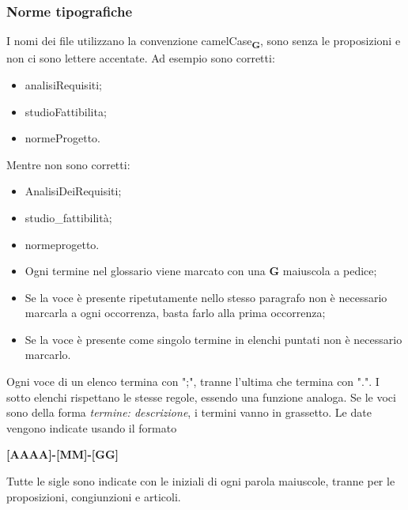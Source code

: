         \subsubsection{Norme tipografiche}
            I nomi dei file utilizzano la convenzione camelCase\textsubscript{\textbf{G}}, sono senza le proposizioni e non ci sono lettere accentate.
            Ad esempio sono corretti:
            \begin{itemize}
                \item analisiRequisiti;
                \item studioFattibilita;
                \item normeProgetto.
            \end{itemize}
            Mentre non sono corretti:
            \begin{itemize}
                \item AnalisiDeiRequisiti;
                \item studio\_fattibilità;
                \item normeprogetto.
            \end{itemize}
            
            \begin{itemize}
                \item Ogni termine nel glossario viene marcato con una \textbf{G} maiuscola a pedice;
                \item Se la voce è presente ripetutamente nello stesso paragrafo non è necessario marcarla a ogni occorrenza, basta farlo alla prima occorrenza;
                \item Se la voce è presente come singolo termine in elenchi puntati non è necessario marcarlo. 
            \end{itemize}
            
            Ogni voce di un elenco termina con ";", tranne l'ultima che termina con ".". I sotto elenchi rispettano le stesse regole, essendo una funzione analoga. Se le voci sono della forma \textit{termine: descrizione}, i termini vanno in grassetto.
            Le date vengono indicate usando il formato
            \begin{center}
                \textbf{[AAAA]-[MM]-[GG]}
            \end{center}
            Tutte le sigle sono indicate con le iniziali di ogni parola maiuscole, tranne per le proposizioni, congiunzioni e articoli.
